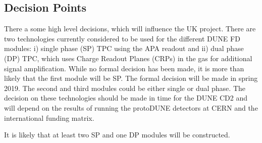 \subsection{Decision Points}

There a some high level decisions, which will influence the UK project. There are two technologies currently considered to be used for the different DUNE FD modules: i) single phase (SP) TPC using the APA readout and ii) dual phase (DP) TPC, which uses Charge Readout Planes (CRPs) in the gas for additional signal amplification. While no formal decision has been made, it is more than likely that the first module will be SP. The formal decision will be made in spring 2019. The second and third modules could be either single or dual phase. The decision on these technologies should be made in time for the DUNE CD2 and will depend on the results of running the protoDUNE detectors at CERN and the international funding matrix.

It is likely that at least two SP and one DP modules will be constructed.

